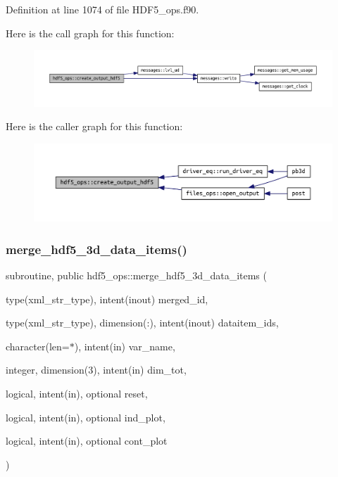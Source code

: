 Definition at line 1074 of file H\+D\+F5\+\_\+ops.\+f90.

Here is the call graph for this function\+:\nopagebreak
\begin{figure}[H]
\begin{center}
\leavevmode
\includegraphics[width=350pt]{namespacehdf5__ops_a1263636fffc4f4aa86f72bd5fd3352a0_cgraph}
\end{center}
\end{figure}
Here is the caller graph for this function\+:\nopagebreak
\begin{figure}[H]
\begin{center}
\leavevmode
\includegraphics[width=350pt]{namespacehdf5__ops_a1263636fffc4f4aa86f72bd5fd3352a0_icgraph}
\end{center}
\end{figure}
\mbox{\label{namespacehdf5__ops_a7b18b66402089eef2288b2d532f6af5d}} 
\subsubsection{\texorpdfstring{merge\+\_\+hdf5\+\_\+3d\+\_\+data\+\_\+items()}{merge\_hdf5\_3d\_data\_items()}}
{\footnotesize\ttfamily subroutine, public hdf5\+\_\+ops\+::merge\+\_\+hdf5\+\_\+3d\+\_\+data\+\_\+items (\begin{DoxyParamCaption}\item[{type(xml\+\_\+str\+\_\+type), intent(inout)}]{merged\+\_\+id,  }\item[{type(xml\+\_\+str\+\_\+type), dimension(\+:), intent(inout)}]{dataitem\+\_\+ids,  }\item[{character(len=$\ast$), intent(in)}]{var\+\_\+name,  }\item[{integer, dimension(3), intent(in)}]{dim\+\_\+tot,  }\item[{logical, intent(in), optional}]{reset,  }\item[{logical, intent(in), optional}]{ind\+\_\+plot,  }\item[{logical, intent(in), optional}]{cont\+\_\+plot }\end{DoxyParamCaption})}



